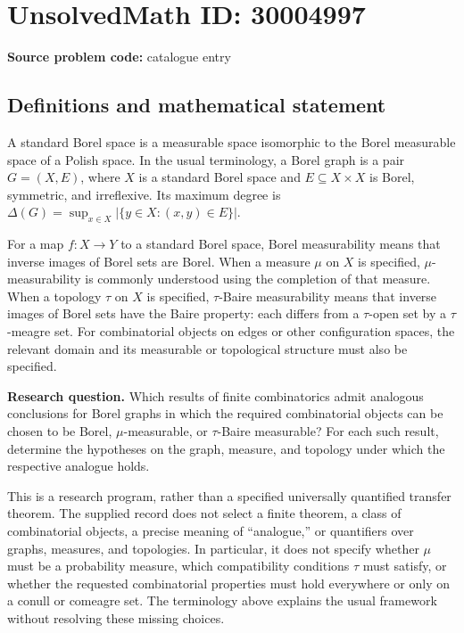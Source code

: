 \documentclass[11pt]{article}
\begin{document}
\section*{UnsolvedMath ID: 30004997}
\textbf{Source problem code:} catalogue entry
\subsection{Definitions and mathematical statement}
A standard Borel space is a measurable space isomorphic to the Borel measurable space of a Polish space. In the usual terminology, a Borel graph is a pair \(G=(X,E)\), where \(X\) is a standard Borel space and \(E\subseteq X\times X\) is Borel, symmetric, and irreflexive. Its maximum degree is \(\Delta(G)=\sup_{x\in X}|\{y\in X:(x,y)\in E\}|\).

For a map \(f:X\to Y\) to a standard Borel space, Borel measurability means that inverse images of Borel sets are Borel. When a measure \(\mu\) on \(X\) is specified, \(\mu\)-measurability is commonly understood using the completion of that measure. When a topology \(\tau\) on \(X\) is specified, \(\tau\)-Baire measurability means that inverse images of Borel sets have the Baire property: each differs from a \(\tau\)-open set by a \(\tau\)-meagre set. For combinatorial objects on edges or other configuration spaces, the relevant domain and its measurable or topological structure must also be specified.

\textbf{Research question.} Which results of finite combinatorics admit analogous conclusions for Borel graphs in which the required combinatorial objects can be chosen to be Borel, \(\mu\)-measurable, or \(\tau\)-Baire measurable? For each such result, determine the hypotheses on the graph, measure, and topology under which the respective analogue holds.

This is a research program, rather than a specified universally quantified transfer theorem. The supplied record does not select a finite theorem, a class of combinatorial objects, a precise meaning of ``analogue,'' or quantifiers over graphs, measures, and topologies. In particular, it does not specify whether \(\mu\) must be a probability measure, which compatibility conditions \(\tau\) must satisfy, or whether the requested combinatorial properties must hold everywhere or only on a conull or comeagre set. The terminology above explains the usual framework without resolving these missing choices.
\end{document}
